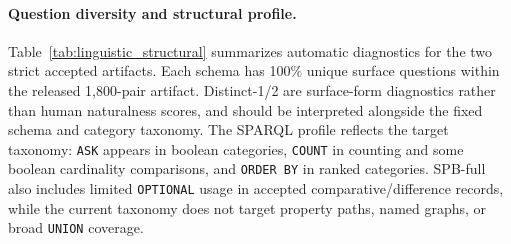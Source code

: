 \documentclass[11pt]{article}
\begin{document}
\begin{table}[t]
  \centering
  \small
  \caption{Primary expanded Phase-3 results. Both schemas are balanced at 200 examples per category across nine categories and pass strict parse, execution, answer-type, and category-form checks.}
  \label{tab:arr_schema_scale}
\end{table}

\begin{table}[t]
  \centering
  \scriptsize
  \caption{Operational efficiency from the contributing primary and top-up run logs. Phase-3 attempts count materialized candidates that reached validation logging; final counts the released exactly balanced artifact; yield is final retained records divided by Phase-3 attempts. Valid Phase-3 records emitted before final category replacement/deduplication were 2{,}686 for Schema C and 1{,}946 for SPB-full. Repairs are all-phase counts with Phase-3 counts in parentheses.}
  \label{tab:primary_runtime}
\end{table}

\paragraph{Question diversity and structural profile.}
Table~\ref{tab:linguistic_structural} summarizes automatic diagnostics for the two strict accepted artifacts. Each schema has 100\% unique surface questions within the released 1{,}800-pair artifact. Distinct-1/2 are surface-form diagnostics rather than human naturalness scores, and should be interpreted alongside the fixed schema and category taxonomy. The SPARQL profile reflects the target taxonomy: \texttt{ASK} appears in boolean categories, \texttt{COUNT} in counting and some boolean cardinality comparisons, and \texttt{ORDER BY} in ranked categories. SPB-full also includes limited \texttt{OPTIONAL} usage in accepted comparative/difference records, while the current taxonomy does not target property paths, named graphs, or broad \texttt{UNION} coverage.
\end{document}
